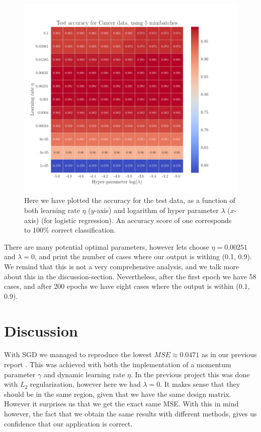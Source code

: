 \documentclass[12pt]{extarticle}
\begin{document}
\begin{figure}[h]
	\includegraphics[width=\linewidth]{../output/plots/reg_Cancer__lambda_eta__Test_accuracy__860729.pdf}
	\caption{Here we have plotted the accuracy for the test data, as a function of both learning rate $\eta$ ($y$-axis) and logarithm of hyper parameter $\lambda$ ($x$-axis) (for logistic regression). An accuracy score of one corresponds to 100\% correct classification.}\label{fig:logreg_eta_lambda}
\end{figure}

There are many potential optimal parameters, however lets choose $\eta= 0.00251$ and $\lambda = 0$, and print the number of cases where our output is withing (0.1, 0.9). We remind that this is not a very comprehensive analysis, and we talk more about this in the discussion-section. Nevertheless, after the first epoch we have 58 cases, and after 200 epochs we have eight cases where the output is within (0.1, 0.9).

\clearpage

\section{Discussion}

With SGD we managed to reproduce the lowest $MSE \approx 0.0471$ as in our previous report \cite{project1}. This was achieved with both the implementation of a momentum parameter $\gamma$ and dynamic learning rate $\eta$. In the previous project this was done with $L_2$ regularization, however here we had $\lambda = 0$. It makes sense that they should be in the same region, given that we have the same design matrix. However it surprises us that we get the exact same MSE. With this in mind however, the fact that we obtain the same results with different methods, gives us confidence that our application is correct.
\end{document}
